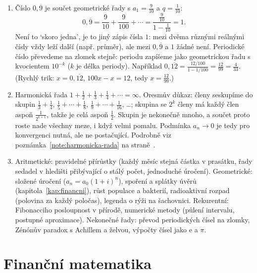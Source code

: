 \begin{enumerate}[label=\textbf{\arabic*.}, leftmargin=*, itemsep=0.8em]
  \item {}
  Číslo $0{,}\overline{9}$ je součet geometrické řady s $a_1 = \frac{9}{10}$ a $q = \frac{1}{10}$:
  \begin{equation*}
    0{,}\overline{9} = \frac{9}{10} + \frac{9}{100} + \cdots = \frac{\frac{9}{10}}{1 - \frac{1}{10}} = 1.
  \end{equation*}
  Není to `skoro jedna', je to jiný zápis čísla $1$: mezi dvěma různými reálnými čísly vždy leží další (např. průměr), ale mezi $0{,}\overline{9}$ a $1$ žádné není. Periodické číslo převedeme na zlomek stejně: periodu zapíšeme jako geometrickou řadu s kvocientem $10^{-k}$ ($k$ je délka periody). Například $0{,}\overline{12} = \frac{12/100}{1 - 1/100} = \frac{12}{99} = \frac{4}{33}$. (Rychlý trik: $x = 0{,}\overline{12}$, $100x - x = 12$, tedy $x = \frac{12}{99}$.) 

  \item {}
  Harmonická řada $1 + \frac{1}{2} + \frac{1}{3} + \frac{1}{4} + \cdots = \infty$. Oresmův důkaz: členy seskupíme do skupin $\frac{1}{3} + \frac{1}{4}$, $\frac{1}{5} + \cdots + \frac{1}{8}$, $\frac{1}{9} + \cdots + \frac{1}{16}$, \ldots; skupina se $2^k$ členy má každý člen aspoň $\frac{1}{2^{k+1}}$, takže je celá aspoň $\frac{1}{2}$. Skupin je nekonečně mnoho, a součet proto roste nade všechny meze, i když velmi pomalu. Podmínka $a_n\to 0$ je tedy pro konvergenci nutná, ale ne postačující. Podrobně viz poznámka~\ref{note:harmonicka-rada} na straně~\pageref{note:harmonicka-rada}.

  \item {}
  Aritmetické: pravidelné přírůstky (každý měsíc stejná částka v prasátku, řady sedadel v hledišti přibývající o stálý počet, jednoduché úročení). Geometrické: složené úročení ($a_n = a_0{(1 + i)}^n$), spoření a splátky úvěrů (kapitola~\ref{kap:financni}), růst populace a bakterií, radioaktivní rozpad (polovina za každý poločas), legenda o rýži na šachovnici. Rekurentní: Fibonacciho posloupnost v přírodě, numerické metody (půlení intervalu, postupné aproximace). Nekonečné řady: převod periodických čísel na zlomky, Zénónův paradox s Achillem a želvou, výpočty čísel jako $\mathrm{e}$ a $\pi$.
\end{enumerate}

\section{Finanční matematika}

